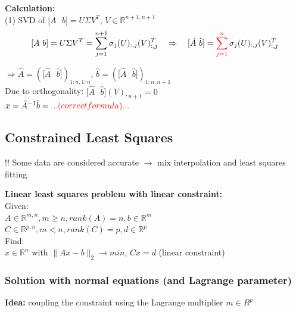 \documentclass[12pt, a4paper]{article}
\newcommand{\R}{\mathbb{R}}
\begin{document}
\textbf{Calculation:} \\
(1) SVD of $\lbrack A \text{ }b \rbrack = U \Sigma V^{T}$, \quad \quad $V \in \R^{n+1, n+1}$ \\
\[ \lbrack A \text{ }b \rbrack =  U \Sigma V^{T} = \sum_{j=1}^{n+1} \sigma_j (U)_{:,j} (V)_{:,j}^{T} \quad \Rightarrow \quad  \lbrack \hat A \text{ } \hat b \rbrack = \color{red}\sum_{j=1}^{n} \color{black}\sigma_j (U)_{:,j} (V)_{:,j}^{T} \]
\begin{center}
$\Rightarrow \hat A = (\lbrack \hat A \text{ } \hat b \rbrack )_{1:n, 1:n}$, \quad $\hat b = (\lbrack \hat A \text{ } \hat b \rbrack )_{1:n, n+1}$ \vspace{2mm}\\
	Due to orthogonality: $\lbrack \hat A \text{ } \hat b \rbrack (V)_{:n+1} = 0$
	\vspace{10mm}\\

	$x = \hat A^{-1} \hat b =\color{red} ... (correct formula)...$
 
\end{center}


\subsection{Constrained Least Squares}

!! Some data are considered accurate $\rightarrow$ mix interpolation and least squares fitting

\begin{tcolorbox}
\textbf{Linear least squares problem with linear constraint:}
\vspace{2mm} \\
Given: \\
$A \in \R^{m,n}, m \geq n, rank(A) = n, b \in \R^{m}$\\
 $C \in \R^{p,n}, m < n, rank(C) = p, d \in \R^{p}$ \\

Find: \\
$x \in \R^{n}$ with $ \lVert Ax - b\rVert_{2} \rightarrow min $, \quad \quad $Cx =d$ (linear constraint)	
\end{tcolorbox}

\subsubsection{Solution with normal equations (and Lagrange parameter)}

\textbf{Idea:} coupling the constraint using the Lagrange multiplier $m \in R^{p}$
\end{document}
